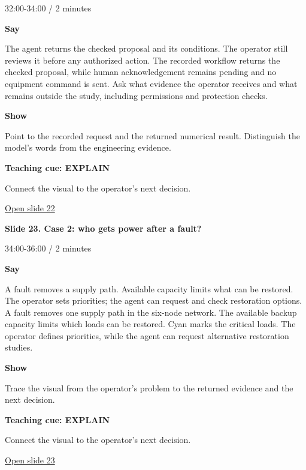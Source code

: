 \documentclass[12pt,letterpaper]{article}
\begin{document}
{\small\color{Slate} 32:00-34:00 /\allowbreak{} 2 minutes\par}\medskip
\textbf{Say}\par The agent returns the checked proposal and its conditions. The operator still reviews it before any authorized action. The recorded workflow returns the checked proposal, while human acknowledgement remains pending and no equipment command is sent. Ask what evidence the operator receives and what remains outside the study, including permissions and protection checks.\par\medskip
\textbf{Show}\par Point to the recorded request and the returned numerical result. Distinguish the model's words from the engineering evidence.\par\medskip
\textbf{Teaching cue: EXPLAIN}\par Connect the visual to the operator's next decision.\par\medskip
\vfill\href{https://alaaselim-sudo.github.io/GridGuard-Agentic-AI-Tutorials/operator-cases/#/22}{Open slide 22}\par
\clearpage{}
{\Large\bfseries\color{IEEEBlue} Slide 23. Case 2: who gets power after a fault?\par}\medskip
{\small\color{Slate} 34:00-36:00 /\allowbreak{} 2 minutes\par}\medskip
\textbf{Say}\par A fault removes a supply path. Available capacity limits what can be restored. The operator sets priorities; the agent can request and check restoration options. A fault removes one supply path in the six-node network. The available backup capacity limits which loads can be restored. Cyan marks the critical loads. The operator defines priorities, while the agent can request alternative restoration studies.\par\medskip
\textbf{Show}\par Trace the visual from the operator's problem to the returned evidence and the next decision.\par\medskip
\textbf{Teaching cue: EXPLAIN}\par Connect the visual to the operator's next decision.\par\medskip
\vfill\href{https://alaaselim-sudo.github.io/GridGuard-Agentic-AI-Tutorials/operator-cases/#/23}{Open slide 23}\par
\clearpage{}
\end{document}
